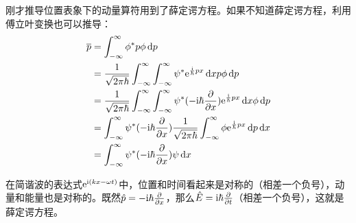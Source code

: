 刚才推导位置表象下的动量算符用到了薛定谔方程。如果不知道薛定谔方程，利用傅立叶变换也可以推导：
\begin{align*}
\overline{p}&=\int_{-\infty}^{\infty} \phi^* p \phi \opd p \\
&=\frac{1}{\sqrt{2 \pi \hbar}} \int_{-\infty}^{\infty} \int_{-\infty}^{\infty} \psi^* \rme^{\frac{\rmi}{\hbar} p x} \opd x p \phi \opd p \\
&=\frac{1}{\sqrt{2 \pi \hbar}} \int_{-\infty}^{\infty} \int_{-\infty}^{\infty} \psi^* (-\rmi \hbar \ppx) \rme^{\frac{\rmi}{\hbar} p x} \opd x \phi \opd p \\
&=\int_{-\infty}^{\infty} \psi^* (-\rmi \hbar \ppx) \frac{1}{\sqrt{2 \pi \hbar}} \int_{-\infty}^{\infty} \phi \rme^{\frac{\rmi}{\hbar} p x} \opd p \opd x \\
&=\int_{-\infty}^{\infty} \psi^* (-\rmi \hbar \ppx) \psi \opd x
\end{align*}

在简谐波的表达式$\mathrm{e}^{\mathrm{i}(k x-\omega t)}$中，位置和时间看起来是对称的（相差一个负号），动量和能量也是对称的。既然$\hat{p}=-\mathrm{i} \hbar \frac{\partial}{\partial x}$，那么$\hat{E}=\mathrm{i} \hbar \frac{\partial}{\partial t}$（相差一个负号），这就是薛定谔方程。
